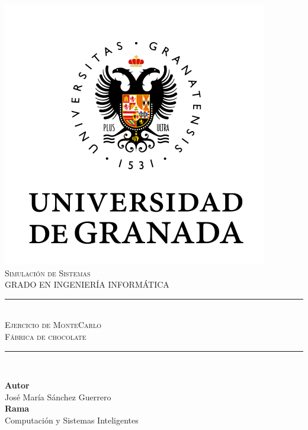 \documentclass[11pt,a4paper]{article}
\newcommand{\asignatura}{Simulación de Sistemas}
\newcommand{\autor}{José María Sánchez Guerrero}
\newcommand{\titulo}{Ejercicio de MonteCarlo}
\newcommand{\subtitulo}{Fábrica de chocolate}
\begin{document}

\begin{titlepage}

\begin{minipage}{\textwidth}

\centering

\includegraphics[scale=0.5]{img/ugr.png}\\

\textsc{\Large \asignatura{}\\[0.2cm]}
\textsc{GRADO EN INGENIERÍA INFORMÁTICA}\\[1cm]

\noindent\rule[-1ex]{\textwidth}{1pt}\\[1.5ex]
\textsc{{\Huge \titulo\\[0.5ex]}}
\textsc{{\Large \subtitulo\\}}
\noindent\rule[-1ex]{\textwidth}{2pt}\\[3.5ex]

\end{minipage}

\vspace{0.5cm}

\begin{minipage}{\textwidth}

\centering

\textbf{Autor}\\ {\autor{}}\\[2.5ex]
\textbf{Rama}\\ {Computación y Sistemas Inteligentes}\\[2.5ex]
\vspace{0.3cm}


\end{minipage}
\end{titlepage}
\end{document}
